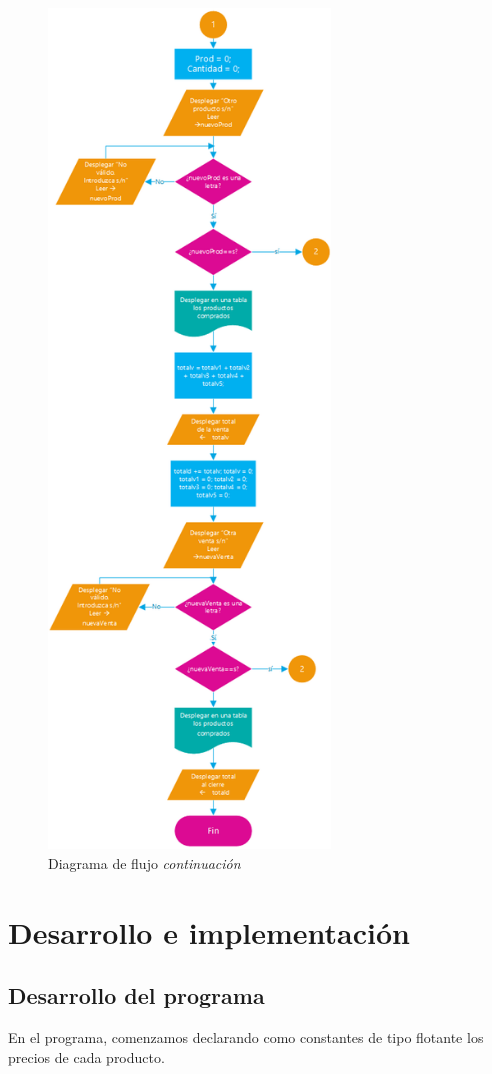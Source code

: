 \documentclass[12pt, letterpaper]{article}
\begin{document}
     \begin{figure}[p]
    \centering
    \includegraphics[width=7.5cm]{D-flujo2-p1.png}
    \caption {Diagrama de flujo \emph{continuación} \label{fig:Fig3}}
    \end{figure} 
    
    
    \newpage
     
    \section{Desarrollo e implementación}
    
    \subsection{Desarrollo del programa}
    En el programa, comenzamos declarando como constantes de tipo flotante los precios de cada producto.
    
\end{document}
